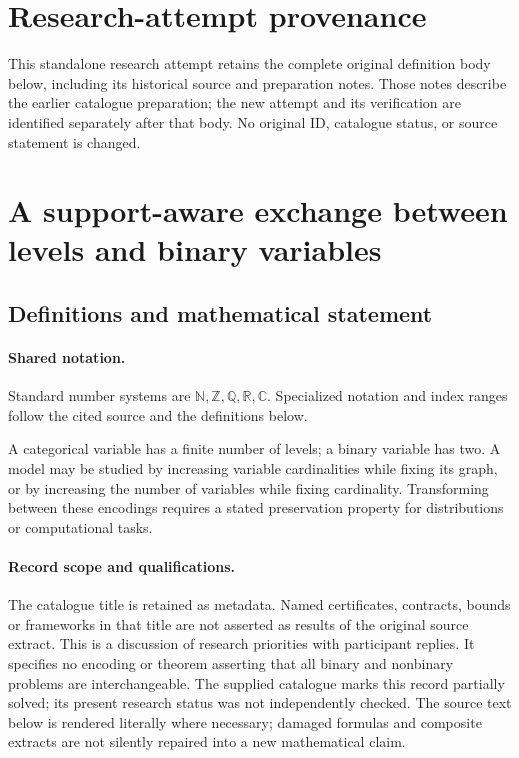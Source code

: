 \documentclass[11pt]{article}
\begin{document}
\section*{Research-attempt provenance}
This standalone research attempt retains the complete original definition body below,
including its historical source and preparation notes. Those notes describe the
earlier catalogue preparation; the new attempt and its verification are identified
separately after that body. No original ID, catalogue status, or source statement is changed.

\section{A support-aware exchange between levels and binary variables}\label{statement}

\subsection{Definitions and mathematical statement}

\paragraph{Shared notation.}Standard number systems are $\mathbb N,\mathbb Z,\mathbb Q,\mathbb R,\mathbb C$. Specialized notation and index ranges follow the cited source and the definitions below.


A categorical variable has a finite number of levels; a binary variable has two. A model may be studied by increasing variable cardinalities while fixing its graph, or by increasing the number of variables while fixing cardinality. Transforming between these encodings requires a stated preservation property for distributions or computational tasks.
\paragraph{Record scope and qualifications.}
The catalogue title is retained as metadata. Named certificates, contracts, bounds or frameworks in that title are not asserted as results of the original source extract.
This is a discussion of research priorities with participant replies. It specifies no encoding or theorem asserting that all binary and nonbinary problems are interchangeable. The supplied catalogue marks this record partially solved; its present research status was not independently checked.
The source text below is rendered literally where necessary; damaged formulas and composite extracts are not silently repaired into a new mathematical claim.
\end{document}
